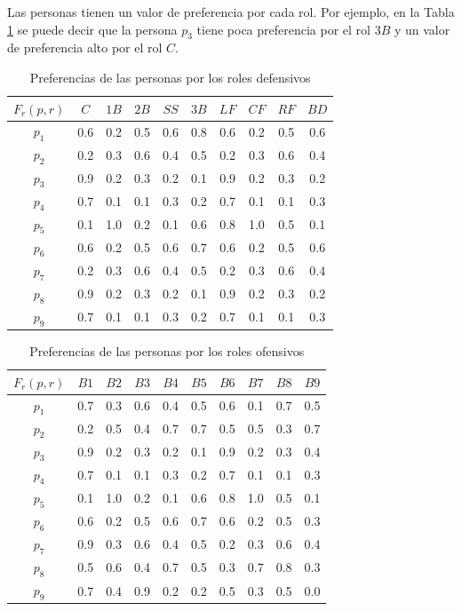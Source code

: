 
Las personas tienen un valor de preferencia por cada rol. Por ejemplo, en la Tabla \ref{prd-pel} se puede decir que la persona $ p_3 $ tiene poca preferencia por el rol $ 3B $ y un valor de preferencia alto por el rol $ C $.
\begin{table}[H]
	\centering
	\caption{Preferencias de las personas por los roles defensivos}\label{prd-pel}
	\begin{tabular}{|c|c|c|c|c|c|c|c|c|c|}
		\hline
		$F_r(p,r)$ & $C$ & $1B$ & $2B$ & $SS$ & $3B$ & $LF$ & $CF$ & $RF$  & $BD$   \\ \hline
		$p_1$   & 0.6 & 0.2 & 0.5 & 0.6 & 0.8 & 0.6 & 0.2 & 0.5 & 0.6 \\ \hline
		$p_2$   & 0.2 & 0.3 & 0.6 & 0.4 & 0.5 & 0.2 & 0.3 & 0.6 & 0.4 \\ \hline
		$p_3$  	& 0.9 & 0.2 & 0.3 & 0.2 & 0.1 & 0.9 & 0.2 & 0.3 & 0.2 \\ \hline
		$p_4$ 	& 0.7 & 0.1 & 0.1 & 0.3 & 0.2 & 0.7 & 0.1 & 0.1 & 0.3 \\ \hline
		$p_5$   & 0.1 & 1.0 & 0.2 & 0.1 & 0.6 & 0.8 & 1.0 & 0.5 & 0.1 \\ \hline
		$p_6$   & 0.6 & 0.2 & 0.5 & 0.6 & 0.7 & 0.6 & 0.2 & 0.5 & 0.6 \\ \hline
		$p_7$   & 0.2 & 0.3 & 0.6 & 0.4 & 0.5 & 0.2 & 0.3 & 0.6 & 0.4 \\ \hline
		$p_8$  	& 0.9 & 0.2 & 0.3 & 0.2 & 0.1 & 0.9 & 0.2 & 0.3 & 0.2 \\ \hline
		$p_9$ 	& 0.7 & 0.1 & 0.1 & 0.3 & 0.2 & 0.7 & 0.1 & 0.1 & 0.3 \\ \hline
	\end{tabular}
\end{table}

\begin{table}[H]
	\centering
	\caption{Preferencias de las personas por los roles ofensivos}\label{pro-pel}
	\begin{tabular}{|c|c|c|c|c|c|c|c|c|c|}
		\hline
		$F_r(p,r)$ & $B1$& $B2$ & $B3$ & $B4$ & $B5$ & $B6$ & $B7$ & $B8$  & $B9$   \\ \hline
		$p_1$   & 0.7 & 0.3 & 0.6 & 0.4 & 0.5 & 0.6 & 0.1 & 0.7 & 0.5 \\ \hline
		$p_2$   & 0.2 & 0.5 & 0.4 & 0.7 & 0.7 & 0.5 & 0.5 & 0.3 & 0.7 \\ \hline
		$p_3$  	& 0.9 & 0.2 & 0.3 & 0.2 & 0.1 & 0.9 & 0.2 & 0.3 & 0.4 \\ \hline
		$p_4$ 	& 0.7 & 0.1 & 0.1 & 0.3 & 0.2 & 0.7 & 0.1 & 0.1 & 0.3 \\ \hline
		$p_5$   & 0.1 & 1.0 & 0.2 & 0.1 & 0.6 & 0.8 & 1.0 & 0.5 & 0.1 \\ \hline
		$p_6$   & 0.6 & 0.2 & 0.5 & 0.6 & 0.7 & 0.6 & 0.2 & 0.5 & 0.3 \\ \hline
		$p_7$   & 0.9 & 0.3 & 0.6 & 0.4 & 0.5 & 0.2 & 0.3 & 0.6 & 0.4 \\ \hline
		$p_8$  	& 0.5 & 0.6 & 0.4 & 0.7 & 0.5 & 0.3 & 0.7 & 0.8 & 0.3 \\ \hline
		$p_9$ 	& 0.7 & 0.4 & 0.9 & 0.2 & 0.2 & 0.5 & 0.3 & 0.5 & 0.0 \\ \hline
	\end{tabular}
\end{table}

